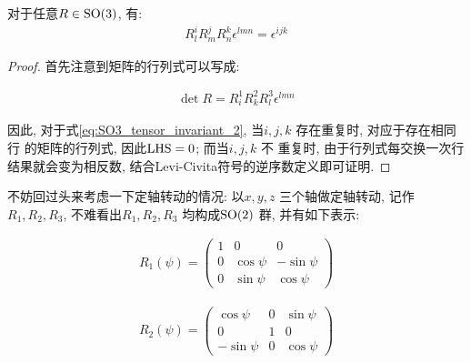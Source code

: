 \begin{lemma}
  对于任意$R\in {\rm SO}(3)$, 有:
  \begin{equation}\label{eq:SO3_tensor_invariant_2}
    \begin{aligned}
      R^{i}_{l}R^{j}_{m}R^{k}_{n} \epsilon^{lmn} = \epsilon^{ijk}
    \end{aligned}
  \end{equation}

\end{lemma}
\begin{proof}
  首先注意到矩阵的行列式可以写成:

  \begin{equation}
    \begin{aligned}
      \det R = R^{1}_{i}R^{2}_{k}R^{3}_{l} \epsilon^{lmn}
    \end{aligned}
  \end{equation}

  因此, 对于式\ref{eq:SO3_tensor_invariant_2},
  当$i,j,k$ 存在重复时, 对应于存在相同行
  的矩阵的行列式, 因此${\rm LHS}=0$; 而当$i,j,k$ 不
  重复时,  由于行列式每交换一次行结果就会变为相反数,
  结合Levi-Civita符号的逆序数定义即可证明.
\end{proof}

不妨回过头来考虑一下定轴转动的情况: 以$x,y,z$ 
三个轴做定轴转动, 记作$R_1, R_2, R_3$,
不难看出$R_1,R_2,R_3$ 均构成${\rm SO}(2)$ 
群, 并有如下表示:

\begin{equation}\label{eq:r1_mat}
  \begin{aligned}
    R_1(\psi) =
    \begin{pmatrix}
      1 & 0 & 0 \\
      0 & \cos \psi & -\sin \psi \\
      0 & \sin \psi & \cos \psi
    \end{pmatrix}
  \end{aligned}
\end{equation}

\begin{equation}\label{eq:r2_mat}
  \begin{aligned}
    R_{2}(\psi) =
    \begin{pmatrix}
      \cos \psi & 0 & \sin \psi \\
      0 & 1 & 0 \\
      -\sin \psi & 0 & \cos \psi
    \end{pmatrix}
  \end{aligned}
\end{equation}

